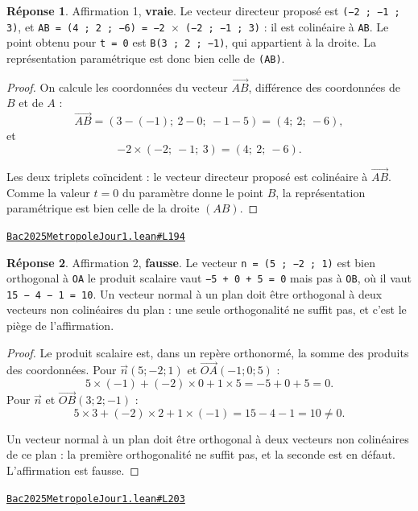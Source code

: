 \documentclass[11pt,a4paper]{article}
\theoremstyle{definition}
\theoremstyle{plain}
\theoremstyle{definition}
\newtheorem*{reponse}{Réponse}
\newcommand{\source}[2]{\par\smallskip\noindent\hfill{\footnotesize\href{#1}{\texttt{#2}}}\par\smallskip}
\begin{document}
\begin{reponse}
Affirmation 1, \textbf{vraie}. Le vecteur directeur proposé est \texttt{(−2 ; −1 ; 3)}, et
\texttt{AB = (4 ; 2 ; −6) = −2 \(\times\) (−2 ; −1 ; 3)} : il est colinéaire à \texttt{AB}. Le point obtenu
pour \texttt{t = 0} est \texttt{B(3 ; 2 ; −1)}, qui appartient à la droite. La représentation
paramétrique est donc bien celle de \texttt{(AB)}.
\end{reponse}
\begin{proof}
On calcule les coordonnées du vecteur $\vec{AB}$, différence des coordonnées de $B$ et de
$A$ :
\[ \vec{AB} = (3 - (-1) ;\ 2 - 0 ;\ -1 - 5) = (4 ;\ 2 ;\ -6) , \]
et
\[ -2 \times (-2 ;\ -1 ;\ 3) = (4 ;\ 2 ;\ -6) . \]

Les deux triplets coïncident : le vecteur directeur proposé est colinéaire à $\vec{AB}$.
Comme la valeur $t = 0$ du paramètre donne le point $B$, la représentation paramétrique
est bien celle de la droite $(AB)$.
\end{proof}
\source{https://github.com/Commutator-IO/learn-lean/blob/main/exams/2025/Bac2025MetropoleJour1.lean\#L194}{Bac2025MetropoleJour1.lean\#L194}

\begin{reponse}
Affirmation 2, \textbf{fausse}. Le vecteur \texttt{n = (5 ; −2 ; 1)} est bien orthogonal à
\texttt{OA} \textemdash{} le produit scalaire vaut \texttt{−5 + 0 + 5 = 0} \textemdash{} mais pas à \texttt{OB}, où il vaut
\texttt{15 − 4 − 1 = 10}. Un vecteur normal à un plan doit être orthogonal à deux vecteurs
non colinéaires du plan : une seule orthogonalité ne suffit pas, et c'est le piège de
l'affirmation.
\end{reponse}
\begin{proof}
Le produit scalaire est, dans un repère orthonormé, la somme des produits des coordonnées.
Pour $\vec{n}(5 ; -2 ; 1)$ et $\vec{OA}(-1 ; 0 ; 5)$ :
\[ 5 \times (-1) + (-2) \times 0 + 1 \times 5 = -5 + 0 + 5 = 0 . \]
Pour $\vec{n}$ et $\vec{OB}(3 ; 2 ; -1)$ :
\[ 5 \times 3 + (-2) \times 2 + 1 \times (-1) = 15 - 4 - 1 = 10 \ne 0 . \]

Un vecteur normal à un plan doit être orthogonal à deux vecteurs non colinéaires de ce
plan : la première orthogonalité ne suffit pas, et la seconde est en défaut. L'affirmation
est fausse.
\end{proof}
\source{https://github.com/Commutator-IO/learn-lean/blob/main/exams/2025/Bac2025MetropoleJour1.lean\#L203}{Bac2025MetropoleJour1.lean\#L203}
\end{document}
